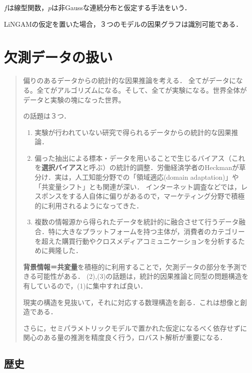 \documentclass[uplatex,dvipdfmx]{jsreport}
\begin{document}
\begin{definition}
    $f$は線型関数，$p$は非Gaussな連続分布と仮定する手法をいう．
\end{definition}

\begin{theorem}
    LiNGAMの仮定を置いた場合，３つのモデルの因果グラフは識別可能である．\cite{清水08}
\end{theorem}

\chapter{欠測データの扱い}

\begin{quotation}
    偏りのあるデータからの統計的な因果推論を考える．
    全てがデータになる。全てがアルゴリズムになる。そして、全てが実験になる。世界全体がデータと実験の塊になった世界。

    \cite{星野}の話題は３つ．
    \begin{enumerate}
        \item 実験が行われていない研究で得られるデータからの統計的な因果推論．
        \item 偏った抽出による標本・データを用いることで生じるバイアス（これを\textbf{選択バイアス}と呼ぶ）の統計的調整．労働経済学者のHeckmanが草分け．実は，人工知能分野での「領域適応(domain adaptation)」や「共変量シフト」とも関連が深い．
        インターネット調査などでは，レスポンスをする人自体に偏りがあるので，マーケティング分野で積極的に利用されるようになってきた．
        \item 複数の情報源から得られたデータを統計的に融合させて行うデータ融合．特に大きなプラットフォームを持つ主体が，消費者のカテゴリーを超えた購買行動やクロスメディアコミュニケーションを分析するために興隆した．
    \end{enumerate}
    \textbf{背景情報＝共変量}を積極的に利用することで，欠測データの部分を予測できる可能性がある．
    (2),(3)の話題は，統計的因果推論と同型の問題構造を有しているので，(1)に集中すれば良い．

    現実の構造を見抜いて，それに対応する数理構造を創る．これは想像と創造である．

    さらに，セミパラメトリックモデルで置かれた仮定になるべく依存せずに関心のある量の推測を精度良く行う，ロバスト解析が重要になる．
\end{quotation}

\section{歴史}
\end{document}
